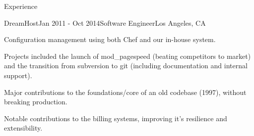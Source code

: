\documentclass{resume} %
\begin{document}
\begin{rSection}{Experience}
\begin{rSubsection}{DreamHost}{Jan 2011 - Oct 2014}{Software Engineer}{Los Angeles, CA}
\item Configuration management using both Chef and our in-house system.
\item Projects included the launch of mod\_pagespeed (beating competitors to market) and the transition from subversion to git (including documentation and internal support).
\item Major contributions to the foundations/core of an old codebase (1997), without breaking production.
\item Notable contributions to the billing systems, improving it's resilience and extensibility.

\end{rSubsection}
\end{rSection}
\end{document}
